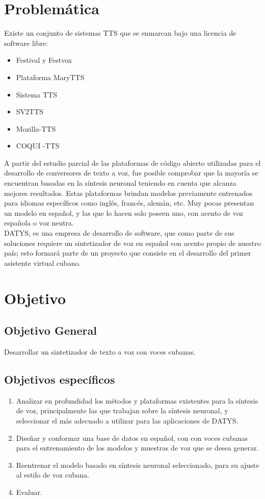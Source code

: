 \section*{Problemática}
Existe un conjunto de sistemas TTS que se enmarcan bajo una licencia de software libre:
\begin{itemize}
	\item Festival y Festvox
	\item Plataforma MaryTTS
	\item Sistema TTS
	\item SV2TTS
	\item Mozilla-TTS
	\item COQUI -TTS
\end{itemize}


A partir del estudio parcial de las plataformas de código abierto utilizadas para el desarrollo de conversores de texto a voz, fue posible comprobar que la mayoría se encuentran basadas en la síntesis neuronal teniendo en cuenta que alcanza mejores resultados. Estas plataformas brindan modelos previamente entrenados para idiomas específicos como inglés, francés, alemán, etc. Muy pocas presentan un modelo en español, y las que lo hacen solo poseen uno, con acento de voz española o voz neutra.\\

DATYS, es una empresa de desarrollo de software, que como parte de sus soluciones requiere un sintetizador de voz en español con acento propio de nuestro país; esto formará parte de un proyecto que consiste en el desarrollo del primer asistente virtual cubano. 

\section*{Objetivo}

\subsection*{Objetivo General}

Desarrollar un sintetizador de texto a voz con voces cubanas.

\subsection*{Objetivos específicos}
\begin{enumerate}
	\item Analizar en profundidad los métodos y plataformas existentes para la síntesis de voz, principalmente las que trabajan sobre la síntesis neuronal, y seleccionar el más adecuado a utilizar para las aplicaciones de DATYS.
	\item Diseñar y conformar una base de datos en español, con con voces cubanas para el entrenamiento de los modelos y muestras de voz que se desea generar.
	\item Reentrenar el modelo basado en síntesis neuronal seleccionado, para su ajuste al estilo de voz cubana.
	\item Evaluar.
\end{enumerate}